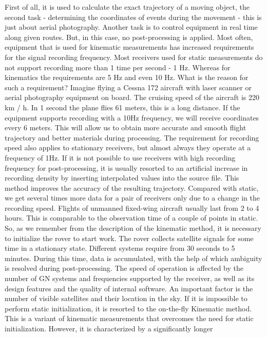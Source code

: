 \documentclass[
  letterpaper,
  DIV=11,
  numbers=noendperiod]{scrreprt}
\begin{document}
First of all, it is used to calculate the exact trajectory of a moving
object, the second task - determining the coordinates of events during
the movement - this is just about aerial photography. Another task is to
control equipment in real time along given routes. But, in this case, no
post-processing is applied. Most often, equipment that is used for
kinematic measurements has increased requirements for the signal
recording frequency. Most receivers used for static measurements do not
support recording more than 1 time per second - 1 Hz. Whereas for
kinematics the requirements are 5 Hz and even 10 Hz. What is the reason
for such a requirement? Imagine flying a Cessna 172 aircraft with laser
scanner or aerial photography equipment on board. The cruising speed of
the aircraft is 220 km / h. In 1 second the plane flies 61 meters, this
is a long distance. If the equipment supports recording with a 10Hz
frequency, we will receive coordinates every 6 meters. This will allow
us to obtain more accurate and smooth flight trajectory and better
materials during processing. The requirement for recording speed also
applies to stationary receivers, but almost always they operate at a
frequency of 1Hz. If it is not possible to use receivers with high
recording frequency for post-processing, it is usually resorted to an
artificial increase in recording density by inserting interpolated
values into the source file. This method improves the accuracy of the
resulting trajectory. Compared with static, we get several times more
data for a pair of receivers only due to a change in the recording
speed. Flights of unmanned fixed-wing aircraft usually last from 2 to 4
hours. This is comparable to the observation time of a couple of points
in static. So, as we remember from the description of the kinematic
method, it is necessary to initialize the rover to start work. The rover
collects satellite signals for some time in a stationary state.
Different systems require from 30 seconds to 5 minutes. During this
time, data is accumulated, with the help of which ambiguity is resolved
during post-processing. The speed of operation is affected by the number
of GN systems and frequencies supported by the receiver, as well as its
design features and the quality of internal software. An important
factor is the number of visible satellites and their location in the
sky. If it is impossible to perform static initialization, it is
resorted to the on-the-fly Kinematic method. This is a variant of
kinematic measurements that overcomes the need for static
initialization. However, it is characterized by a significantly longer
\end{document}
